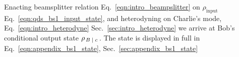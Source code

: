 \noindent Enacting beamsplitter relation Eq.~\ref{eqn:intro_beampslitter} on $\rho_{\text{input}}$ Eq.~\ref{eqn:qds_bs1_input_state}, and heterodyning on Charlie's mode, Eq.~\ref{eqn:intro_heterodyne} Sec.~\ref{sec:intro_heterodyne} we arrive at Bob's conditional output state $\rho_{\left. B \; \middle| \; c \right.}$. The state is displayed in full in Eq.~\ref{eqn:appendix_bs1_state}, Sec.~\ref{sec:appendix_bs1_state}


\iffalse
\begin{align}\label{eqn:qds_bs1_deriv_2}
%
&\tilde{\rho}_B\left(c\right) = \frac{e^{-\left|\alpha_k\right|^2}}{\pi}\left(1 - e^{-\tilde{\beta}}\right) \sum_{n, m, p=0}^\infty \frac{\alpha_k^n \overline{\alpha_k}^m}{\sqrt{n! m!}} e^{- p \tilde{\beta}} \sqrt{n! p! m! p!} \notag \\
%
&\sum_{k_1, k_2, l_1, l_2=0}^{n, p, m, p} \pmqty{n \\ k_1} \pmqty{p \\ k-2} \pmqty{m \\ l_1} \pmqty{p \\ l_2} \left(\sqrt{T}\right)^{k_1 + l_1} \left(\sqrt{1-T}\right)^{n + m - k_1 - l_1} \notag \\
%
&\left(-\sqrt{1-T}\right)^{k_2 + l_2} \left(\sqrt{T}\right)^{2 p - k_2 - l_2} \sqrt{\left(n + p - k_1 - k_2\right)!} \notag \\
%
&\sqrt{\left(m + p - l_1 - l_2\right)!} \dyad{n + p - k_1 - k_2}{m + p - l_1 - l_2} \delta_{k_1+k_2}^{l_1+l_2} \left[ e^{-\left|c\right|^2} c^{k_1 + k_2} \overline{c}^{l_1 + l_2} \right]
%
\end{align}
\fi

